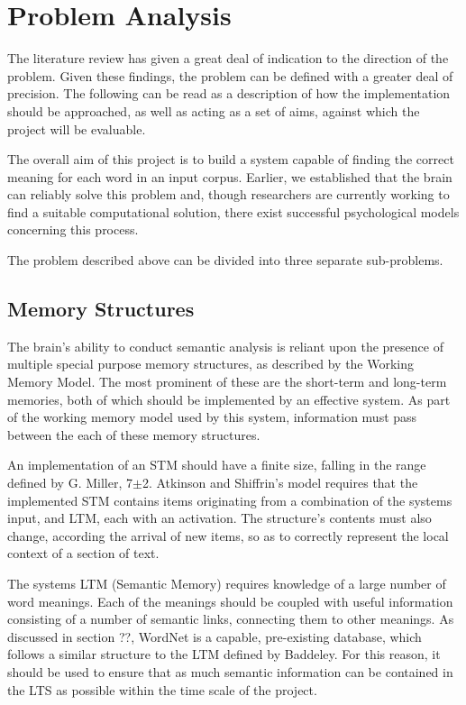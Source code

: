 \documentclass[]{article}
\begin{document}
\section{Problem Analysis}
\label{sec:ProbAnalysis}

The literature review has given a great deal of indication to the direction of the problem. Given these findings, the problem can be defined with a greater deal of precision. The following can be read as a description of how the implementation should be approached, as well as acting as a set of aims, against which the project will be evaluable.

The overall aim of this project is to build a system capable of finding the correct meaning for each word in an input corpus. Earlier, we established that the brain can reliably solve this problem and, though researchers are currently working to find a suitable computational solution, there exist successful psychological models concerning this process. 

The problem described above can be divided into three separate sub-problems.

\subsection{Memory Structures}
\label{sec:PAMem}

The brain’s ability to conduct semantic analysis is reliant upon the presence of multiple special purpose memory structures, as described by the Working Memory Model. The most prominent of these are the short-term and long-term memories, both of which should be implemented by an effective system.  As part of the working memory model used by this system, information must pass between the each of these memory structures. 

An implementation of an STM should have a finite size, falling in the range defined by G. Miller, 7$\pm$2.  Atkinson and Shiffrin’s model requires that the implemented STM contains items originating from a combination of the systems input, and LTM, each with an activation. The structure’s contents must also change, according the arrival of new items, so as to correctly represent the local context of a section of text.

The systems LTM (Semantic Memory) requires knowledge of a large number of word meanings. Each of the meanings should be coupled with useful information consisting of a number of semantic links, connecting them to other meanings. As discussed in section ??, WordNet is a capable, pre-existing database, which follows a similar structure to the LTM defined by Baddeley. For this reason, it should be used to ensure that as much semantic information can be contained in the LTS as possible within the time scale of the project.
\end{document}
